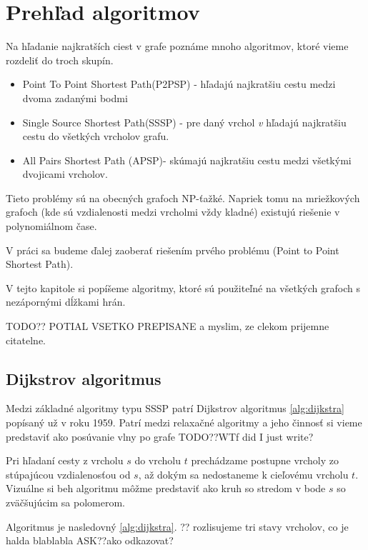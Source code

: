 \chapter{Prehľad algoritmov}
Na hľadanie najkratších ciest v grafe poznáme mnoho algoritmov, ktoré vieme rozdeliť do troch skupín.


\begin{itemize}
\item Point To Point Shortest Path(P2PSP) - hľadajú najkratšiu cestu medzi dvoma zadanými bodmi
\item Single Source Shortest Path(SSSP) - pre daný vrchol {\sl v} hľadajú najkratšiu cestu do všetkých vrcholov grafu.
\item All Pairs Shortest Path (APSP)- skúmajú najkratšiu cestu medzi všetkými dvojicami vrcholov.
\end{itemize}

Tieto problémy sú na obecných grafoch NP-ťažké.
Napriek tomu na mriežkových grafoch (kde sú vzdialenosti medzi vrcholmi vždy kladné) existujú riešenie v polynomiálnom čase.

V práci sa budeme ďalej zaoberať riešením prvého problému (Point to Point Shortest Path). 

V tejto kapitole si popíšeme algoritmy, ktoré sú použiteľné na všetkých grafoch 
s nezápornými dĺžkami hrán.

TODO?? POTIAL VSETKO PREPISANE a myslim, ze clekom prijemne citatelne.

\section{Dijkstrov algoritmus}
Medzi základné algoritmy typu SSSP patrí Dijkstrov algoritmus \ref{alg:dijkstra} popísaný už v roku 1959.
Patrí medzi relaxačné algoritmy a jeho činnosť si vieme predstaviť ako posúvanie vlny po grafe TODO??WTf did I just write?


Pri hľadaní cesty z vrcholu $s$ do vrcholu $t$ prechádzame postupne vrcholy zo stúpajúcou vzdialenosťou od $s$, až dokým sa nedostaneme k cieľovému vrcholu $t$.
Vizuálne si beh algoritmu môžme predstaviť ako kruh so stredom v bode $s$ so zväčšujúcim sa polomerom.

Algoritmus je nasledovný \ref{alg:dijkstra}. 
?? rozlisujeme tri stavy vrcholov, co je halda blablabla
ASK??ako odkazovat?


